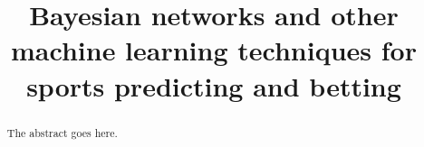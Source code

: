 \documentclass[conference]{IEEEtran}
\begin{document}
%
\title{Bayesian networks and other machine learning techniques for sports predicting and betting}


\author{
}


% 








\maketitle

\begin{abstract}
The abstract goes here.
\end{abstract}
\end{document}
